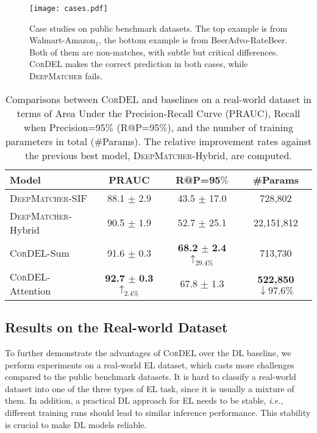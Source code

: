 \documentclass[conference]{IEEEtran}
\begin{document}
\begin{figure}
	\centering
	\texttt{[image: cases.pdf]}
	\caption{Case studies on public benchmark datasets. The top example is from Walmart-Amazon$_1$, the bottom example is from BeerAdvo-RateBeer. Both of them are non-matches, with subtle but critical differences. \textsc{CorDEL} makes the correct prediction in both cases, while \textsc{DeepMatcher} fails.}
	\label{fig:cases}
\end{figure}



\begin{table*}
	\centering
	\caption{Comparisons between \textsc{CorDEL} and baselines on a real-world dataset in terms of Area Under the Precision-Recall Curve (PRAUC), Recall when Precision=95$\%$ (R@P=95$\%$), and the number of training parameters in total (\#Params). The relative improvement rates against the previous best model, \textsc{DeepMatcher}-Hybrid, are computed.}
	\label{table:real_world}
	\begin{tabular}{lccc}
		\toprule
		Model & PRAUC & R@P=95$\%$ & \#Params \\
		\midrule
		\textsc{DeepMatcher}-SIF & 88.1 $\pm$ 2.9 & 43.5 $\pm$ 17.0 & 728,802 \\
		\textsc{DeepMatcher}-Hybrid & 90.5 $\pm$ 1.9 & 52.7 $\pm$ 25.1 & 22,151,812 \\
		\midrule
		\textsc{CorDEL}-Sum & 91.6 $\pm$ 0.3 & \textbf{68.2} $\pm$ \textbf{2.4} $\uparrow_{29.4\%}$ & 713,730 \\
		\textsc{CorDEL}-Attention & \textbf{92.7} $\pm$ \textbf{0.3} $\uparrow_{2.4\%}$ & 67.8 $\pm$ 1.3 & \textbf{522,850} $\downarrow {97.6\%}$\\
		\bottomrule
	\end{tabular}
\end{table*}




\subsection{Results on the Real-world Dataset}\label{sec:real_world_dataset}

To further demonstrate the advantages of \textsc{CorDEL} over the DL baseline, we perform experiments on a real-world EL dataset, which casts more challenges compared to the public benchmark datasets. It is hard to classify a real-world dataset into one of the three types of EL task, since it is usually a mixture of them. In addition, a practical DL approach for EL needs to be stable, \textit{i.e.}, different training runs should lead to similar inference performance. This stability is crucial to make DL models reliable.
\end{document}
